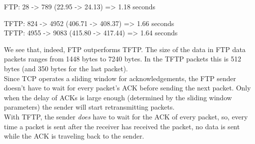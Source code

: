 FTP: 28 -> 789 (22.95 -> 24.13) => 1.18 seconds

TFTP: 824 -> 4952 (406.71 -> 408.37) => 1.66 seconds \\
TFTP: 4955 -> 9083 (415.80 -> 417.44) => 1.64 seconds

We see that, indeed, FTP outperforms TFTP.
The size of the data in FTP data packets ranges from 1448 bytes to 7240 bytes. In the TFTP packets this is 512 bytes (and 350 bytes for the last packet). \\

Since TCP operates a sliding window for acknowledgements, the FTP sender doesn't have to wait for every packet's ACK before sending the next packet. Only when the delay of ACKs is large enough (determined by the sliding window parameters) the sender will start retransmitting packets. \\
With TFTP, the sender \emph{does} have to wait for the ACK of every packet, so, every time a packet is sent after the receiver has received the packet, no data is sent while the ACK is traveling back to the sender.
